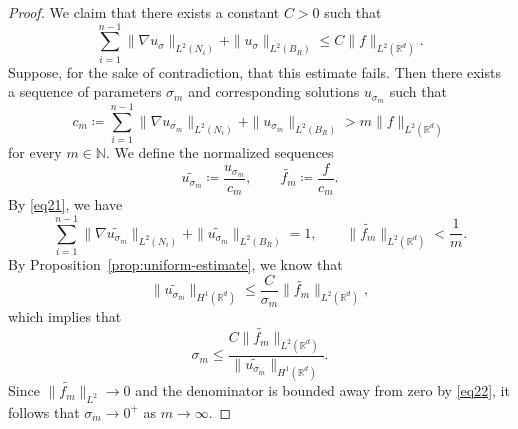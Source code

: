 \documentclass[12pt,reqno]{amsart}
\numberwithin{equation}{section}
\begin{document}
\begin{proof}
We claim that there exists a constant $C > 0$ such that
\begin{equation*}
    \sum_{i=1}^{n-1} \|\nabla u_\sigma\|_{L^2(N_i)} + \|u_\sigma\|_{L^2(B_R)} \le C \|f\|_{L^2(\mathbb{R}^d)}.
\end{equation*}
Suppose, for the sake of contradiction, that this estimate fails. Then there exists a sequence of parameters $\sigma_m$ and corresponding solutions $u_{\sigma_m}$ such that
\begin{equation}\label{eq21}
    c_m \coloneqq \sum_{i=1}^{n-1} \|\nabla u_{\sigma_m}\|_{L^2(N_i)} + \|u_{\sigma_m}\|_{L^2(B_R)} > m \|f\|_{L^2(\mathbb{R}^d)}
\end{equation}
for every $m \in \mathbb{N}$. We define the normalized sequences
\begin{equation*}
    \widetilde{u_{\sigma_m}} \coloneqq \frac{u_{\sigma_m}}{c_m}, \qquad \widetilde{f_m} \coloneqq \frac{f}{c_m}.
\end{equation*}
By \eqref{eq21}, we have
\begin{equation}\label{eq22}
    \sum_{i=1}^{n-1} \|\nabla \widetilde{u_{\sigma_m}}\|_{L^2(N_i)} + \|\widetilde{u_{\sigma_m}}\|_{L^2(B_R)} = 1, \qquad 
    \|\widetilde{f_m}\|_{L^2(\mathbb{R}^d)} < \frac{1}{m}.
\end{equation}
By Proposition~\ref{prop:uniform-estimate}, we know that
\begin{equation*}
    \|\widetilde{u_{\sigma_m}}\|_{H^1(\mathbb{R}^d)} \le \frac{C}{\sigma_m} \|\widetilde{f_m}\|_{L^2(\mathbb{R}^d)},
\end{equation*}
which implies that
\begin{equation*}
    \sigma_m \le \frac{C \|\widetilde{f_m}\|_{L^2(\mathbb{R}^d)}}{\|\widetilde{u_{\sigma_m}}\|_{H^1(\mathbb{R}^d)}}.
\end{equation*}
Since $\|\widetilde{f_m}\|_{L^2} \to 0$ and the denominator is bounded away from zero by \eqref{eq22}, it follows that $\sigma_m \to 0^+$ as $m \to \infty$.


\end{proof}
\end{document}
